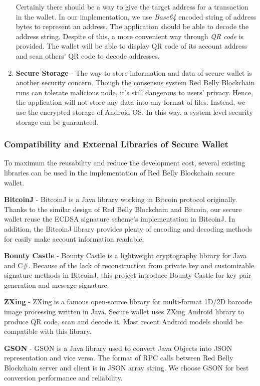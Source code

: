 \documentclass[12pt]{article}
\begin{document}
\begin{enumerate}
   Certainly there should be a way to give the target address for a transaction in the wallet. In our implementation, we use \textit{Base64} encoded string of address bytes to represent an address. The application should be able to decode the address string. Despite of this, a more convenient way through \textit{QR code} is provided. The wallet will be able to display QR code of its account address and scan others' QR code to decode addresses. 

   \item \textbf{Secure Storage} - The way to store information and data of secure wallet is another security concern. Though the consensus system Red Belly Blockchain runs can tolerate malicious node, it's still dangerous to users' privacy. Hence, the application will not store any data into any format of files. Instead, we use the encrypted storage of Android OS. In this way, a system level security storage can be guaranteed.
\end{enumerate}

\subsubsection{Compatibility and External Libraries of Secure Wallet}

To maximum the reusability and reduce the development cost, several existing libraries can be used in the implementation of Red Belly Blockchain secure wallet.

\textbf{BitcoinJ} - BitcoinJ is a Java library working in Bitcoin protocol originally. Thanks to the similar design of Red Belly Blockchain and Bitcoin, our secure wallet reuse the ECDSA signature scheme's implementation in BitcoinJ. In addition, the BitcoinJ library provides plenty of encoding and decoding methods for easily make account information readable.

\textbf{Bounty Castle} - Bounty Castle is a lightweight cryptography library for Java and C#. Because of the lack of reconstruction from private key and customizable signature methods in BitcoinJ, this project introduce Bounty Castle for key pair generation and message signature. 

\textbf{ZXing} - ZXing is a famous open-source library for multi-format 1D/2D barcode image processing written in Java. Secure wallet uses ZXing Android library to produce QR code, scan and decode it. Most recent Android models should be compatible with this library.

\textbf{GSON} - GSON is a Java library used to convert Java Objects into JSON representation and vice versa. The format of RPC calls between Red Belly Blockchain server and client is in JSON array string. We choose GSON for best conversion performance and reliability.
\end{document}
